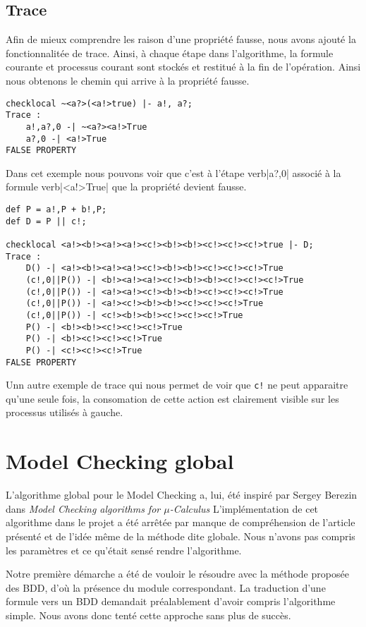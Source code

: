 \documentclass[a4paper]{article}
\begin{document}
\subsection{Trace}

Afin de mieux comprendre les raison d'une propriété fausse, nous avons ajouté la fonctionnalitée de trace. Ainsi, à chaque étape dans l'algorithme, la formule courante et processus courant sont stockés et restitué à la fin de l'opération. Ainsi nous obtenons le chemin qui arrive à la propriété fausse.

\begin{verbatim}
checklocal ~<a?>(<a!>true) |- a!, a?;
Trace : 
	a!,a?,0 -| ~<a?><a!>True
	a?,0 -| <a!>True
FALSE PROPERTY
\end{verbatim}

Dans cet exemple nous pouvons voir que c'est à l'étape verb|a?,0| associé à la formule verb|<a!>True| que la propriété devient fausse.

\begin{verbatim}
def P = a!,P + b!,P;
def D = P || c!;

checklocal <a!><b!><a!><a!><c!><b!><b!><c!><c!><c!>true |- D;
Trace : 
	D() -| <a!><b!><a!><a!><c!><b!><b!><c!><c!><c!>True
	(c!,0||P()) -| <b!><a!><a!><c!><b!><b!><c!><c!><c!>True
	(c!,0||P()) -| <a!><a!><c!><b!><b!><c!><c!><c!>True
	(c!,0||P()) -| <a!><c!><b!><b!><c!><c!><c!>True
	(c!,0||P()) -| <c!><b!><b!><c!><c!><c!>True
	P() -| <b!><b!><c!><c!><c!>True
	P() -| <b!><c!><c!><c!>True
	P() -| <c!><c!><c!>True
FALSE PROPERTY
\end{verbatim}

Unn autre exemple de trace qui nous permet de voir que \verb|c!| ne peut apparaitre qu'une seule fois, la consomation de cette action est clairement visible sur les processus utilisés à gauche.

\section{Model Checking global}

L'algorithme global pour le Model Checking a, lui, été inspiré par
Sergey Berezin dans \emph{Model Checking algorithms for
$\mu$-Calculus} L'implémentation de cet algorithme dans le projet a
été arrêtée par manque de compréhension de l'article présenté et de
l'idée même de la méthode dite globale. Nous n'avons pas compris les
paramètres et ce qu'était sensé rendre l'algorithme.

Notre première démarche a été de vouloir le résoudre avec la méthode
proposée des BDD, d'où la présence du module correspondant. La
traduction d'une formule vers un BDD demandait préalablement d'avoir
compris l'algorithme simple. Nous avons donc tenté cette approche sans
plus de succès.
\end{document}
